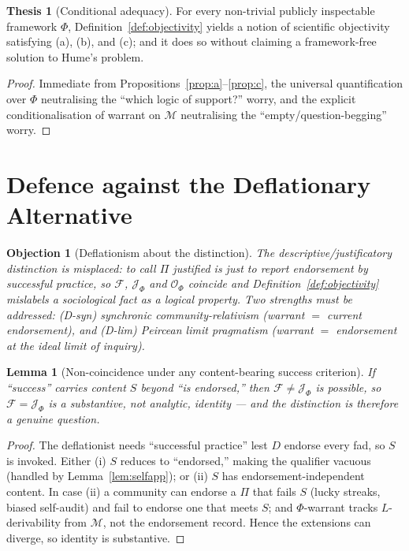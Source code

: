 \documentclass{amsart}
\theoremstyle{definition}
\newtheorem{thesis}{Thesis}
\theoremstyle{plain}
\newtheorem{lemma}{Lemma}
\newtheorem{objection}{Objection}
\theoremstyle{remark}
\begin{document}
\begin{thesis}[Conditional adequacy]\label{thesis:adequacy}
For every non-trivial publicly inspectable framework $\Phi$,
Definition~\ref{def:objectivity} yields a notion of scientific objectivity
satisfying (a), (b), and (c); and it does so without claiming a framework-free
solution to Hume's problem.
\end{thesis}

\begin{proof}
Immediate from Propositions~\ref{prop:a}--\ref{prop:c}, the universal
quantification over $\Phi$ neutralising the ``which logic of support?'' worry,
and the explicit conditionalisation of warrant on $\mathcal{M}$ neutralising
the ``empty/question-begging'' worry.
\end{proof}

\section{Defence against the Deflationary Alternative}

\begin{objection}[Deflationism about the distinction]\label{obj:deflation}
The descriptive/justificatory distinction is misplaced: to call $\Pi$ justified
is just to report endorsement by successful practice, so $\mathcal{F}$,
$\mathcal{J}_\Phi$ and $\mathcal{O}_\Phi$ coincide and
Definition~\ref{def:objectivity} mislabels a sociological fact as a logical
property. Two strengths must be addressed: \emph{(D-syn)} synchronic
community-relativism (warrant $=$ current endorsement), and \emph{(D-lim)}
Peircean limit pragmatism (warrant $=$ endorsement at the ideal limit of
inquiry).
\end{objection}

\begin{lemma}[Non-coincidence under any content-bearing success criterion]
\label{lem:noncoincide}
If ``success'' carries content $S$ beyond ``is endorsed,'' then
$\mathcal{F}\neq\mathcal{J}_\Phi$ is possible, so $\mathcal{F}=\mathcal{J}_\Phi$
is a substantive, not analytic, identity --- and the distinction is therefore a
genuine question.
\end{lemma}

\begin{proof}
The deflationist needs ``successful practice'' lest $D$ endorse every fad, so
$S$ is invoked. Either (i) $S$ reduces to ``endorsed,'' making the qualifier
vacuous (handled by Lemma~\ref{lem:selfapp}); or (ii) $S$ has
endorsement-independent content. In case (ii) a community can endorse a
$\Pi$ that fails $S$ (lucky streaks, biased self-audit) and fail to endorse one
that meets $S$; and $\Phi$-warrant tracks $L$-derivability from $\mathcal{M}$,
not the endorsement record. Hence the extensions can diverge, so identity is
substantive.
\end{proof}
\end{document}
